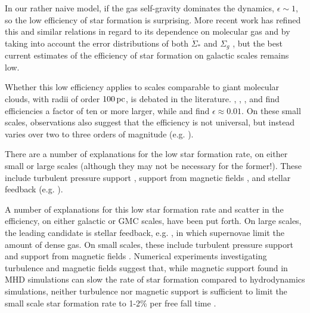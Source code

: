 \documentclass[../dissertation.tex]{subfiles}
\begin{document}
In our rather naive model, if the gas self-gravity dominates the dynamics, $\epsilon \sim 1$, so the low efficiency of star formation is surprising. 
More recent work has refined this and similar relations in regard to its dependence on molecular gas \citep{2008AJ....136.2846B} and by taking into account the error distributions of both $\dot\Sigma_*$ and $\Sigma_g$ \citep{2013MNRAS.430..288S}, but the best current estimates of the efficiency of star formation on galactic scales remains low. 

Whether this low efficiency applies to scales comparable to giant molecular clouds, with radii of
order $100\,\rm pc$, is debated in the literature.
\citet{2010ApJ...723.1019H}, \citet{2010ApJ...724..687L}, \citet{2010ApJS..188..313W}, and \citet{2011ApJ...729..133M} 
find efficiencies a factor of ten or more larger, while \citet{2007ApJ...654..304K} and \citet{2012ApJ...745...69K} 
find $\epsilon\approx0.01$.
On these small scales, observations also suggest that the efficiency is not universal, but instead 
varies over two to three orders of magnitude (e.g.  
\citealt{1988ApJ...334L..51M,2016arXiv160805415L}).%

There are a number of explanations for the low star formation rate, on 
either small or large scales (although they may not be necessary for the former!). 
These include turbulent pressure support \citep{1992ApJ...396..631M}, support from magnetic fields
\citep{1966MNRAS.132..359S,1976ApJ...207..141M}, and stellar feedback (e.g.
\citealt{1986ApJ...303...39D}).  

A number of explanations for this low star formation rate and scatter in the efficiency, on either galactic or GMC scales, have been put forth.
On large scales, the leading candidate is stellar feedback, e.g. \citet{1986ApJ...303...39D}, in which supernovae limit the amount of dense gas. 
On small scales, these include turbulent pressure support \citep{1992ApJ...396..631M} and support from magnetic fields \citep{1966MNRAS.132..359S,1976ApJ...207..141M}. 
Numerical experiments investigating turbulence and magnetic fields suggest that, while magnetic support found in MHD simulations can slow the rate of star formation 
compared to hydrodynamics simulations, neither turbulence nor magnetic support is sufficient to limit the small scale star formation rate to 1-2\% per free fall time
\citep{2010ApJ...709...27W,2011MNRAS.410L...8C,2011ApJ...730...40P,2012ApJ...754...71K,2014MNRAS.439.3420M,2015ApJ...808...48B,2017ApJ...838...40M}.
\end{document}
